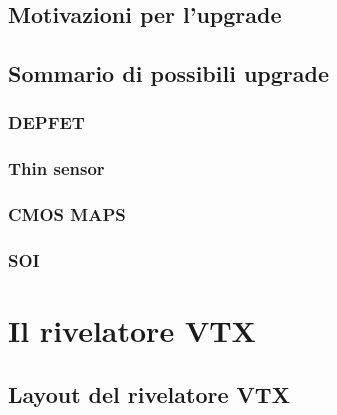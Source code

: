 \documentclass[10pt,a4paper,twoside]{report}
\begin{document}
\section{Motivazioni per l'upgrade}




\section{Sommario di possibili upgrade}

\subsection{DEPFET}

\subsection{Thin sensor}

\subsection{CMOS MAPS}

\subsection{SOI}


\chapter{Il rivelatore VTX}


\section{Layout del rivelatore VTX}
\end{document}
